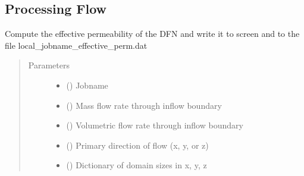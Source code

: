 \documentclass[letterpaper,10pt,english]{sphinxmanual}
\begin{document}
\subsection{Processing Flow}
\label{\detokenize{pydfnworks:module-pydfnworks.dfnFlow.mass_balance}}\label{\detokenize{pydfnworks:processing-flow}}

\begin{fulllineitems}
\label{\detokenize{pydfnworks:pydfnworks.dfnFlow.mass_balance.dump_effective_perm}}
Compute the effective permeability of the DFN and write it to screen and to the file local\_jobname\_effective\_perm.dat
\begin{quote}\begin{description}
\item[{Parameters}] \leavevmode\begin{itemize}
\item {} 
 () \textendash{} Jobname

\item {} 
 () \textendash{} Mass flow rate through inflow boundary

\item {} 
 () \textendash{} Volumetric flow rate through inflow boundary

\item {} 
 () \textendash{} Primary direction of flow (x, y, or z)

\item {} 
 () \textendash{} Dictionary of domain sizes in x, y, z


\end{itemize}
\end{description}
\end{quote}
\end{fulllineitems}
\end{document}
